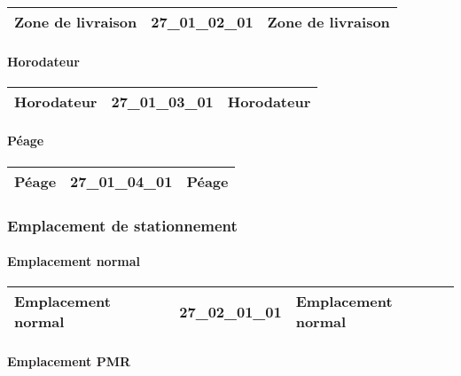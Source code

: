 \documentclass[12pt,titlepage]{book}
\begin{document}
\renewcommand{\arraystretch}{1.2}
\begin{supertabular}{|p{10cm}|c|p{15cm}|}
 Zone de livraison & 27\_01\_02\_01 & Zone de livraison\\
\hline
\end{supertabular}


\paragraph{Horodateur}
\noindent
\vspace{\baselineskip}

\renewcommand{\arraystretch}{1.2}
\begin{supertabular}{|p{10cm}|c|p{15cm}|}
 Horodateur & 27\_01\_03\_01 & Horodateur\\
\hline
\end{supertabular}


\paragraph{Péage}
\noindent
\vspace{\baselineskip}

\renewcommand{\arraystretch}{1.2}
\begin{supertabular}{|p{10cm}|c|p{15cm}|}
 Péage & 27\_01\_04\_01 & Péage\\
\hline
\end{supertabular}

\subsubsection{\large Emplacement de stationnement}
\paragraph{Emplacement normal}
\noindent
\vspace{\baselineskip}

\renewcommand{\arraystretch}{1.2}
\begin{supertabular}{|p{10cm}|c|p{15cm}|}
 Emplacement normal & 27\_02\_01\_01 & Emplacement normal\\
\hline
\end{supertabular}


\paragraph{Emplacement PMR}
\noindent
\vspace{\baselineskip}
\end{document}
